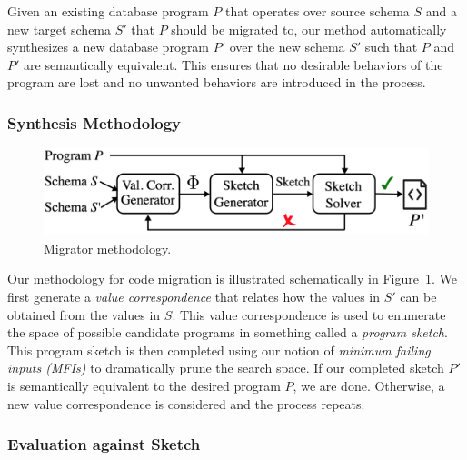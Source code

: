 \documentclass[]{article}
\begin{document}

            Given an existing database program $P$ that operates over source schema $S$ and a new target schema $S'$ that $P$ should be migrated to, our method automatically synthesizes a new database program $P'$ over the new schema $S'$ such that $P$ and $P'$ are semantically equivalent. This ensures that no desirable behaviors of the program are lost and no unwanted behaviors are introduced in the process.



            \subsubsection{Synthesis Methodology}

                \begin{figure}[]
                    \centering
                    \includegraphics[width=.7\textwidth]{migrator_methodology}
                    \caption{Migrator methodology.}
                    \label{fig:migrator_methodology}
                \end{figure}

                Our methodology for code migration is illustrated schematically in Figure~\ref{fig:migrator_methodology}. We first generate a \textit{value correspondence} that relates how the values in $S'$ can be obtained from the values in $S$. This value correspondence is used to enumerate the space of possible candidate programs in something called a \textit{program sketch}. This program sketch is then completed using our notion of \textit{minimum failing inputs (MFIs)} to dramatically prune the search space. If our completed sketch $P'$ is semantically equivalent to the desired program $P$, we are done. Otherwise, a new value correspondence is considered and the process repeats. 
            
            \subsubsection{Evaluation against Sketch}
\end{document}
